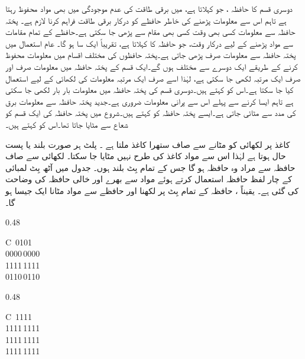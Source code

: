 دوسری قسم کا حافظہ ، جو  کہلاتا ہے، میں برقی طاقت کی عدم موجودگی میں بھی مواد محفوظ رہتا ہے تاہم اس سے معلومات پڑھنے کی خاطر حافظے کو درکار برقی طاقت فراہم کرنا لازم ہے۔ پختہ حافظہ سے معلومات کسی بھی وقت کسی بھی مقام سے پڑھی جا سکتی ہے۔حافظے کے تمام مقامات سے مواد پڑھنے کے لیے درکار وقت، جو حافظہ کا کہلاتا ہے، تقریباً ایک سا  ہو گا۔ عام استعمال میں پختہ حافظہ سے معلومات صرف پڑھی جاتی ہے۔پختہ حافظوں کی مختلف اقسام میں معلومات محفوظ کرنے کے طریقے ایک دوسرے سے مختلف ہوں گے۔ایک قسم کے پختہ حافظہ میں معلومات صرف اور صرف ایک مرتبہ لکھی جا سکتی ہے، لہٰذا اسے صرف ایک مرتبہ معلومات کی لکھائی کے لیے استعمال کیا جا سکتا ہے۔اس کو  کہتے ہیں۔دوسری قسم کی پختہ حافظہ میں معلومات بار بار لکھی جا سکتی ہے تاہم ایسا کرنے سے پہلے اس سے پرانی معلومات ضروری ہے۔جدید پختہ حافظہ سے معلومات برق کی مدد سے مٹائی جاتی ہے۔ایسے پختہ حافظہ کو  کہتے ہیں۔شروع میں پختہ حافظہ کی ایک قسم کو شعاع سے مٹایا جاتا تھا۔اس کو  کہتے ہیں۔

کاغذ پر لکھائی کو مٹانے سے صاف ستھرا کاغذ ملتا ہے ۔ پلٹ ہر صورت بلند یا پست حال ہوتا ہے لہٰذا اس سے مواد کاغذ کی طرح نہیں مٹایا جا سکتا۔ لکھائی سے صاف حافظہ سے مراد وہ حافظہ ہو گا جس کے تمام بِٹ بلند  ہوں۔ جدول  میں آٹھ بِٹ لمبائی کے چار لفظ حافظہ استعمال کرتے ہوئے مواد سے بھرے اور خالی حافظہ کی وضاحت کی گئی ہے۔ یقیناً ، حافظہ کے تمام بِٹ پر  لکھنا اور حافظے سے مواد مٹانا ایک جیسا ہو گا۔
\begin{table}
\caption{حافظہ سے مواد مٹانے کا مفہوم}
\label{جدول_حافظہ_خالی}
\centering
\begin{subtable}[t]{0.48\textwidth}
\centering
\begin{tabular}{C}
\,0101\\
0000\,0000\\
1111\,1111\\
0110\,0110\\
\bottomrule
\end{tabular}
\caption{مواد سے بھرا حافظہ}
\end{subtable}%
\begin{subtable}[t]{0.48\textwidth}
\centering
\begin{tabular}{C}
\,1111\\
1111\,1111\\
1111\,1111\\
1111\,1111\\
\bottomrule
\end{tabular}
\caption{مواد سے خالی حافظہ}
\end{subtable}
\end{table}


